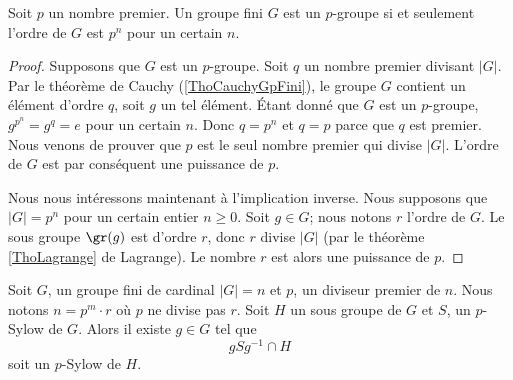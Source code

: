 \begin{proposition}
    Soit \( p\) un nombre premier. Un groupe fini \( G\) est un $p$-groupe si et seulement l'ordre de \( G\) est \( p^n\) pour un certain \( n\).
\end{proposition}

\begin{proof}
    Supposons que \( G\) est un $p$-groupe. Soit \( q\) un nombre premier divisant \( | G |\). Par le théorème de Cauchy (\ref{ThoCauchyGpFini}), le groupe \( G\) contient un élément d'ordre \( q\), soit \( g\) un tel élément. Étant donné que \( G\) est un $p$-groupe, \( g^{p^n}=g^q=e\) pour un certain \( n\). Donc $q=p^n$ et \( q=p\) parce que \( q\) est premier. Nous venons de prouver que \( p\) est le seul nombre premier qui divise \( | G |\). L'ordre de \( G\) est par conséquent une puissance de \( p\).

    Nous nous intéressons maintenant à l'implication inverse. Nous supposons que \( | G |=p^n\) pour un certain entier \( n\geq 0\). Soit \( g\in G\); nous notons \( r\) l'ordre de \( G\). Le sous groupe \( \gr(g)\) est d'ordre \( r\), donc \( r\) divise \( | G |\) (par le théorème \ref{ThoLagrange} de Lagrange). Le nombre \( r\) est alors une puissance de \( p\).
\end{proof}

\begin{lemma}       \label{LemwDYQMg}
    Soit \( G\), un groupe fini de cardinal \( | G |=n\) et \( p\), un diviseur premier de \( n\). Nous notons \( n=p^m\cdot r\) où \( p\) ne divise pas \( r\). Soit \( H\) un sous groupe de \( G\) et \( S\), un \( p\)-Sylow de \( G\). Alors il existe \( g\in G\) tel que 
    \begin{equation}
        gSg^{-1}\cap H
    \end{equation}
    soit un \( p\)-Sylow de \( H\).
\end{lemma}

